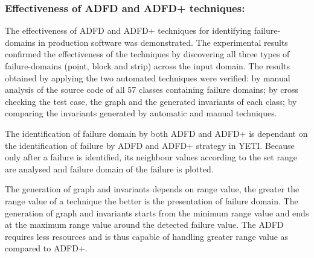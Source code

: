 






\subsubsection{Effectiveness of ADFD and ADFD+ techniques:}
The effectiveness of ADFD and ADFD+ techniques for identifying failure-domains in production software was demonstrated. The experimental results confirmed the effectiveness of the techniques by discovering all three types of failure-domains (point, block and strip) across the input domain. The results obtained by applying the two automated techniques were verified: by manual analysis of the source code of all 57 classes containing failure domains; by cross checking the test case, the graph and the generated invariants of each class; by comparing the invariants generated by automatic and manual techniques. 

The identification of failure domain by both ADFD and ADFD+ is dependant on the identification of failure by ADFD and ADFD+ strategy in YETI. Because only after a failure is identified, its neighbour values according to the set range are analysed and failure domain of the failure is plotted.

The generation of graph and invariants depends on range value, the greater the range value of a technique the better is the presentation of failure domain. The generation of graph and invariants starts from the minimum range value and ends at the maximum range value around the detected failure value. The ADFD requires less resources and is thus capable of handling  greater range value as compared to ADFD+.  




